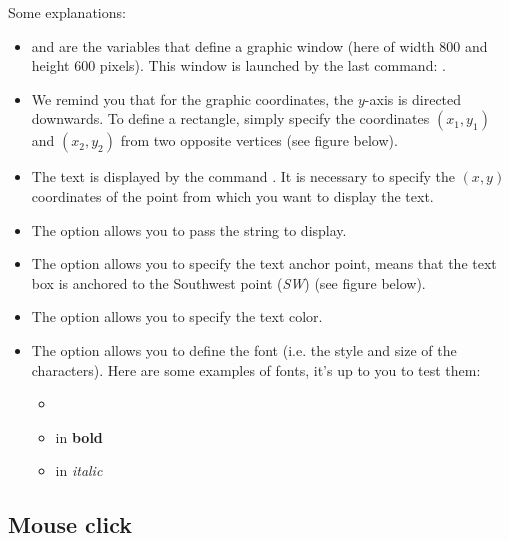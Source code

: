 \documentclass[11pt,class=report,crop=false]{standalone}
\begin{document}
Some explanations:
\begin{itemize}
  \item {} and  are the variables that define a graphic window (here of width $800$ and height $600$ pixels). This window is launched by the last command: .
  
  \item We remind you that for the graphic coordinates, the $y$-axis is directed downwards. To define a rectangle, simply specify the coordinates 
  $(x_1,y_1)$ and $(x_2,y_2)$ from two opposite vertices (see figure below). 
  
  \item The text is displayed by the command . It is necessary to specify the $(x,y)$ coordinates of the point from which you want to display the text. 
  
  \item The  option allows you to pass the string to display.
  
  \item The  option allows you to specify the text anchor point,  means that the text box is anchored to the Southwest point (\emph{SW}) (see figure below).
  
  \item The  option allows you to specify the text color.
  
  \item The  option allows you to define the font (i.e. the style and size of the characters). Here are some examples of fonts, it's up to you to test them:
  \begin{itemize}
    \item {} 
    \item {} in \textbf{bold}
    \item {} in \emph{italic}
  \end{itemize}  
\end{itemize}





\subsection{Mouse click}
\end{document}
